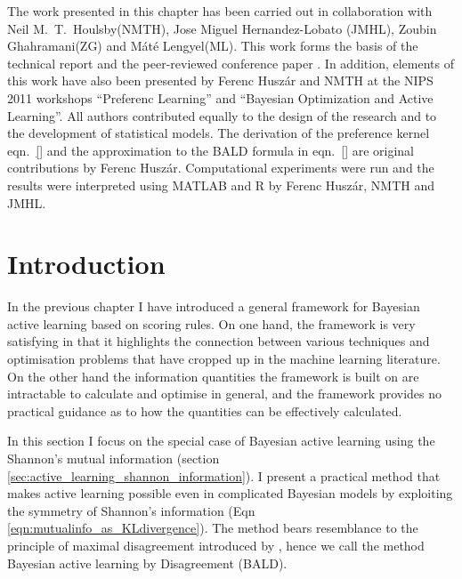 

\begin{summarycontributions}
The work presented in this chapter has been carried out in collaboration with Neil M.\ T.\ Houlsby(NMTH), Jose Miguel Hernandez-Lobato (JMHL), Zoubin Ghahramani(ZG) and M\'{a}t\'{e} Lengyel(ML). This work forms the basis of the technical report \citep{ArxivBALD} and the peer-reviewed conference paper \citep{NIPS2012}. In addition, elements of this work have also been presented by Ferenc Husz\'{a}r and NMTH at the NIPS 2011 workshops ``Preferenc Learning'' and ``Bayesian Optimization and Active Learning''. All authors contributed equally to the design of the research and to the development of statistical models. The derivation of the preference kernel eqn.\ \eqref{} and the approximation to the BALD formula in eqn.\ \eqref{} are original contributions by Ferenc Husz\'{a}r. Computational experiments were run and the results were interpreted using MATLAB and R by Ferenc Husz\'{a}r, NMTH and JMHL.
\end{summarycontributions}

\section{Introduction}

In the previous chapter I have introduced a general framework for Bayesian active learning based on scoring rules. On one hand, the framework is very satisfying in that it highlights the connection between various techniques and optimisation problems that have cropped up in the machine learning literature. On the other hand the information quantities the framework is built on are intractable to calculate and optimise in general, and the framework provides no practical guidance as to how the quantities can be effectively calculated.

In this section I focus on the special case of Bayesian active learning using the Shannon's mutual information (section \ref{sec:active_learning_shannon_information}). I present a practical method that makes active learning possible even in complicated Bayesian models by exploiting the symmetry of Shannon's information (Eqn \eqref{eqn:mutualinfo_as_KLdivergence}). The method bears resemblance to the principle of maximal disagreement introduced by \citet{seung1992}, hence we call the method Bayesian active learning by Disagreement (BALD).

